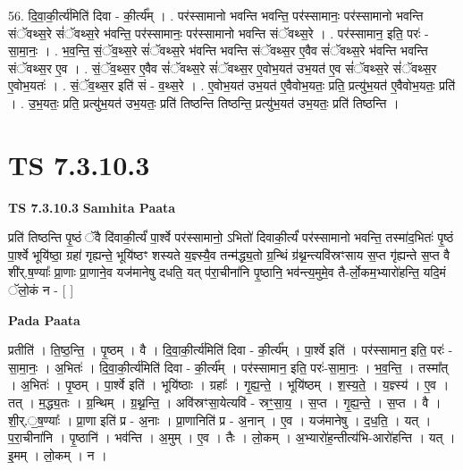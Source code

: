 \documentclass[17pt]{extarticle}
\begin{document}
56. दि॒वा॒की॒र्त्य॑मिति॑ दिवा - की॒र्त्य᳚म् । . पर॑स्सामानो भवन्ति भवन्ति॒ पर॑स्सामानः॒ पर॑स्सामानो भवन्ति संॅवथ्स॒रे सं॑ॅवथ्स॒रे भ॑वन्ति॒ पर॑स्सामानः॒ पर॑स्सामानो भवन्ति संॅवथ्स॒रे । . पर॑स्सामान॒ इति॒ परः॑ - सा॒मा॒नः॒ । . भ॒व॒न्ति॒ सं॒ॅव॒थ्स॒रे सं॑ॅवथ्स॒रे भ॑वन्ति भवन्ति संॅवथ्स॒र ए॒वैव सं॑ॅवथ्स॒रे भ॑वन्ति भवन्ति संॅवथ्स॒र ए॒व । . सं॒ॅव॒थ्स॒र ए॒वैव सं॑ॅवथ्स॒रे सं॑ॅवथ्स॒र ए॒वोभ॒यत॑ उभ॒यत॑ ए॒व सं॑ॅवथ्स॒रे सं॑ॅवथ्स॒र ए॒वोभ॒यतः॑ । . सं॒ॅव॒थ्स॒र इति॑ सं - व॒थ्स॒रे । . ए॒वोभ॒यत॑ उभ॒यत॑ ए॒वैवोभ॒यतः॒ प्रति॒ प्रत्यु॑भ॒यत॑ ए॒वैवोभ॒यतः॒ प्रति॑ । . उ॒भ॒यतः॒ प्रति॒ प्रत्यु॑भ॒यत॑ उभ॒यतः॒ प्रति॑ तिष्ठन्ति तिष्ठन्ति॒ प्रत्यु॑भ॒यत॑ उभ॒यतः॒ प्रति॑ तिष्ठन्ति । \newline
\pagebreak
{}

\section{ TS 7.3.10.3 }

\textbf{TS 7.3.10.3 } \newline
\textbf{Samhita Paata} \newline

प्रति॑ तिष्ठन्ति पृ॒ष्ठं ॅवै दि॑वाकी॒र्त्यं॑ पा॒र्श्वे पर॑स्सामानो॒ ऽभितो॑ दिवाकी॒र्त्यं॑ पर॑स्सामानो भवन्ति॒ तस्मा॑द॒भितः॑ पृ॒ष्ठं पा॒र्श्वे भूयि॑ष्ठा॒ ग्रहा॑ गृह्यन्ते॒ भूयि॑ष्ठꣳ शस्यते य॒ज्ञ्स्यै॒व तन्म॑द्ध्य॒तो ग्र॒न्थिं ग्र॑थ्न॒न्त्यवि॑स्रꣳसाय स॒प्त गृ॑ह्यन्ते स॒प्त वै शी॑र्.ष॒ण्याः᳚ प्रा॒णाः प्रा॒णाने॒व यज॑मानेषु दधति॒ यत् प॑रा॒चीना॑नि पृ॒ष्ठानि॒ भव॑न्त्य॒मुमे॒व तै-र्लो॒कम॒भ्यारो॑हन्ति॒ यदि॒मं ॅलो॒कं न - [  ] \newline

\textbf{Pada Paata} \newline

प्रतीति॑ । ति॒ष्ठ॒न्ति॒ । पृ॒ष्ठम् । वै । दि॒वा॒की॒र्त्य॑मिति॑ दिवा - की॒र्त्य᳚म् । पा॒र्श्वे इति॑ । पर॑स्सामान॒ इति॒ परः॑ - सा॒मा॒नः॒ । अ॒भितः॑ । दि॒वा॒की॒र्त्य॑मिति॑ दिवा - की॒र्त्य᳚म् । पर॑स्सामान॒ इति॒ परः॑-सा॒मा॒नः॒ । भ॒व॒न्ति॒ । तस्मा᳚त् । अ॒भितः॑ । पृ॒ष्ठम् । पा॒र्श्वे इति॑ । भूयि॑ष्ठाः । ग्रहाः᳚ । गृ॒ह्य॒न्ते॒ । भूयि॑ष्ठम् । श॒स्य॒ते॒ । य॒ज्ञ्स्य॑ । ए॒व । तत् । म॒द्ध्य॒तः । ग्र॒न्थिम् । ग्र॒थ्न॒न्ति॒ । अवि॑स्रꣳसा॒येत्यवि॑ - स्रꣳ॒॒सा॒य॒ । स॒प्त । गृ॒ह्य॒न्ते॒ । स॒प्त । वै । शी॒र्.॒ष॒ण्याः᳚ । प्रा॒णा इति॑ प्र - अ॒नाः । प्रा॒णानिति॑ प्र - अ॒नान् । ए॒व । यज॑मानेषु । द॒ध॒ति॒ । यत् । प॒रा॒चीना॑नि । पृ॒ष्ठानि॑ । भव॑न्ति । अ॒मुम् । ए॒व । तैः । लो॒कम् । अ॒भ्यारो॑ह॒न्तीत्य॑भि-आरो॑हन्ति । यत् । इ॒मम् । लो॒कम् । न ।  \newline
\end{document}
